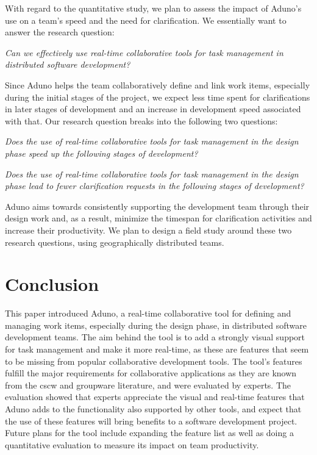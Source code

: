 \documentclass[conference]{IEEEtran}
\begin{document}
With regard to the quantitative study, we plan to assess the impact of Aduno's use on a team's speed and the need for clarification. We essentially want to answer the research question:

\textit{Can we effectively use real-time collaborative tools for task management in distributed software development?} 

Since Aduno helps the team collaboratively define and link work items, especially during the initial stages of the project, we expect less time spent for clarifications in later stages of development and an increase in development speed associated with that. Our research question breaks into the following two questions:

\textit{Does the use of real-time collaborative tools for task management in the design phase speed up the following stages of development?}

\textit{Does the use of real-time collaborative tools for task management in the design phase lead to fewer clarification requests in the following stages of development?}

Aduno aims towards consistently supporting the development team through their design work and, as a result, minimize the timespan for clarification activities and increase their productivity. We plan to design a field study around these two research questions, using geographically distributed teams. 

\section{Conclusion}
\label{sec:conclusion}
This paper introduced Aduno, a real-time collaborative tool for defining and managing work items, especially during the design phase, in distributed software development teams. The aim behind the tool is to add a strongly visual support for task management and make it more real-time, as these are features that seem to be missing from popular collaborative development tools. The tool's features fulfill the major requirements for collaborative applications as they are known from the {\sc cscw} and groupware literature, and were evaluated by experts. The evaluation showed that experts appreciate the visual and real-time features that Aduno adds to the functionality also supported by other tools, and expect that the use of these features will bring benefits to a software development project. Future plans for the tool include expanding the feature list as well as doing a quantitative evaluation to measure its impact on team productivity.

 

\end{document}
